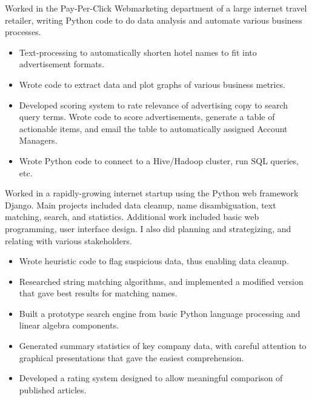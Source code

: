 \documentclass[11pt,a4paper,sans]{moderncv} %
\begin{document}
{Worked in the Pay-Per-Click Webmarketing department of a large internet travel retailer, writing Python code to do data analysis and automate various business processes.
\begin{itemize}
	\item Text-processing to automatically shorten hotel names to fit into advertisement formats.
	\item Wrote code to extract data and plot graphs of various business metrics.
	\item Developed scoring system to rate relevance of advertising copy to search query terms.  Wrote code to score advertisements, generate a table of actionable items, and email the table to automatically assigned Account Managers.
	\item Wrote Python code to connect to a Hive/Hadoop cluster, run SQL queries, etc.
\end{itemize}
}
\vspace{0.2em}

{Worked in a rapidly-growing internet startup using the Python web framework Django.  Main projects included data cleanup, name disambiguation, text matching, search, and statistics.  Additional work included basic web programming, user interface design.  I also did planning and strategizing, and relating with various stakeholders.
\begin{itemize}
	\item Wrote heuristic code to flag suspicious data, thus enabling data cleanup.
	\item Researched string matching algorithms, and implemented a modified version that gave best results for matching names.
	\item Built a prototype search engine from basic Python language processing and linear algebra components.
	\item Generated summary statistics of key company data, with careful attention to graphical presentations that gave the easiest comprehension.
	\item Developed a rating system designed to allow meaningful comparison of published articles.
\end{itemize}
}
\end{document}
